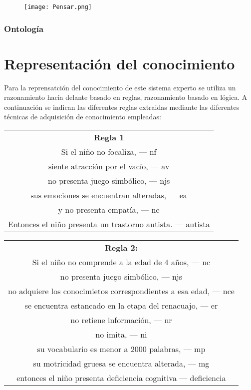 \documentclass[letterpaper,12pt]{article}
\begin{document}
\begin{figure}[h!]
				\begin{center}
					\texttt{[image: Pensar.png]}
				\end{center}
			\end{figure}
			
\clearpage
\subsubsection{Ontología}

\section{Representación del conocimiento}
Para la reprensatción del conocimiento de este sistema experto se utiliza
un razonamiento hacia delante basado en reglas, razonamiento basado en
lógica. A continuación se indican las diferentes reglas extraidas mediante las diferentes técnicas de adquisición de conocimiento empleadas: \\

\begin{center}
\begin{tabular}{|c|}
\hline 
\textbf{Regla 1} \\ 
Si el niño no focaliza, — nf \\
siente atracción por el vacío, — av \\
no presenta juego simbólico, — njs \\
sus emociones se encuentran alteradas, — ea \\
y no presenta empatía, — ne \\ 
Entonces el niño presenta un trastorno autista. — autista \\
\hline 
\end{tabular} 
\end{center}
\begin{center}
\begin{tabular}{|c|}
\hline 
 \textbf{Regla 2:} \\
Si el niño no comprende a la edad de 4 años, — nc \\
no presenta juego simbólico, — njs \\
no adquiere los conocimietos correspondientes a esa edad, — nce\\
se encuentra estancado en la etapa del renacuajo, — er\\
no retiene información, — nr \\
no imita, — ni \\
su vocabulario es menor a 2000 palabras, — mp \\
su motricidad gruesa se encuentra alterada, — mg \\
entonces el niño presenta deficiencia cognitiva — deficiencia\\ 
\hline 
\end{tabular} 
\end{center}
\end{document}

